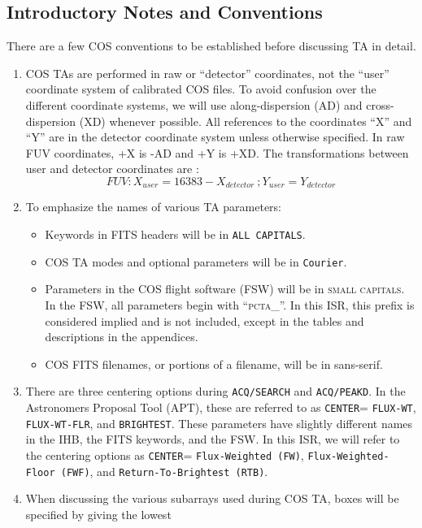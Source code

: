 \documentclass[12pt]{article}
\begin{document}
\subsection{Introductory Notes and Conventions}
\vspace{-0.3cm}
There are a few COS conventions to be established before discussing TA in detail.
\begin{enumerate}
	\item{COS TAs are performed in raw or ``detector'' coordinates, not the ``user'' coordinate system of calibrated
		COS files. To avoid confusion over the different coordinate systems, we will use along-dispersion (AD) and cross-dispersion
		(XD) whenever possible.
		All references to the coordinates ``X'' and ``Y'' are in the detector coordinate system unless otherwise
		specified.
		In raw FUV coordinates, +X is -AD and +Y is +XD.
		The transformations between user and detector coordinates are :
		\begin{equation} FUV: X_{user} = 16383 - X_{detector} \ ; Y_{user} = Y_{detector} \end{equation}
		}
	\item{To emphasize the names of various TA parameters:
		\begin{itemize}
			\item{Keywords in FITS headers will be in \texttt{ALL CAPITALS}.}
			\item{COS TA modes and optional parameters will be in \texttt{Courier}.}
			\item{Parameters in the COS flight software (FSW) will be in \textsc{small capitals}.
In the FSW, all parameters begin with ``\textsc{pcta\_}''. In this ISR, this prefix is considered implied and is not included,
except in the tables and descriptions in the appendices.}
			\item{COS FITS filenames, or portions of a filename, will be in {\sf sans-serif}.}
		\end{itemize}
	}
	\item{There are three centering options during \texttt{ACQ/SEARCH} and \texttt{ACQ/PEAKD}. In the Astronomers Proposal Tool (APT), these are
		referred to as \texttt{CENTER}= \texttt{FLUX-WT}, \texttt{FLUX-WT-FLR}, and \texttt{BRIGHTEST}.
		These parameters have slightly different names in the IHB, the FITS keywords, and the FSW.
		In this ISR, we will refer to the centering options as \texttt{CENTER}= \texttt{Flux-Weighted (FW)},
		 \texttt{Flux-Weighted-Floor (FWF)}, and \texttt{Return-To-Brightest (RTB)}.
	}
	\item{When discussing the various subarrays used during COS TA, boxes will be specified by giving the lowest
}
\end{enumerate}
\end{document}

